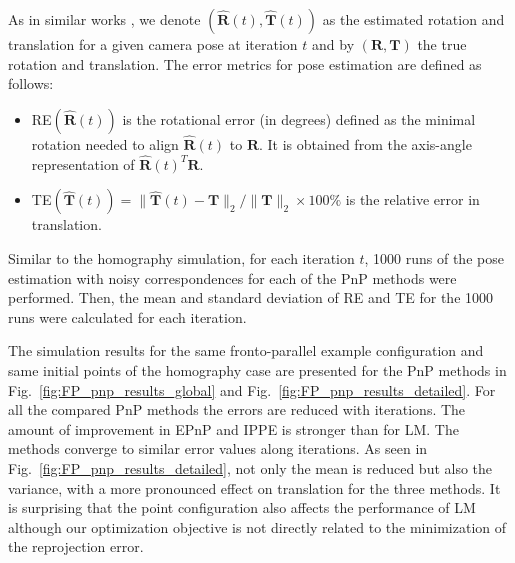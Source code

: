\documentclass[letterpaper, 10 pt, conference]{ieeeconf}  %
\begin{document}
	As in similar works \cite{Lepetit2008,Collins2014}, we denote $\left(\hat{\mathbf{R}}(t), \hat{\mathbf{T}}(t)\right)$ as the estimated rotation and translation for a given camera pose at iteration $t$ and by $(\mathbf{R}, \mathbf{T})$ the true rotation and translation. The error metrics for pose estimation are defined as follows:
	\begin{itemize}
		\item  RE$\left(\hat{\mathbf{R}}(t)\right)$ is the rotational error (in degrees) defined as the minimal rotation needed to align $\hat{\mathbf{R}}(t)$ to $\mathbf{R}$. It is obtained from the axis-angle representation of $\hat{\mathbf{R}}(t)^T\mathbf{R}$.
		
		\item TE$\left(\hat{\mathbf{T}}(t)\right) = \|\hat{\mathbf{T}}(t) - \mathbf{T}\|_2/\|\mathbf{T}\|_2\times 100 \%$ is the relative error in translation. 
	\end{itemize}
	
	Similar to the homography simulation, for each iteration $t$, 1000 runs of the pose estimation with noisy correspondences for each of the PnP methods were performed. Then, the mean and standard deviation of RE and TE for the 1000 runs were calculated for each iteration.
	
	The simulation results for the same fronto-parallel example configuration and same initial points of the homography case are presented for the PnP methods in Fig.~\ref{fig:FP_pnp_results_global} and Fig.~\ref{fig:FP_pnp_results_detailed}. For all the compared PnP methods the errors are reduced with iterations. The amount of improvement in EPnP and IPPE is stronger than for LM. The methods converge to similar error values along iterations. As seen in Fig.~\ref{fig:FP_pnp_results_detailed}, not only the mean is reduced but also the variance, with a more pronounced effect on translation for the three methods. It is surprising that the point configuration also affects the performance of LM although our optimization objective is not directly related to the minimization of the reprojection error.
	
	
	
	
	
\end{document}

